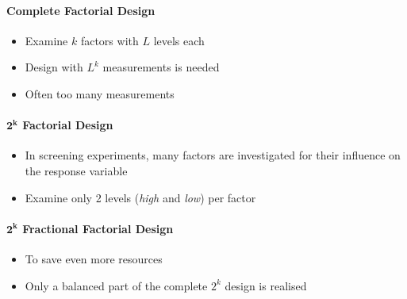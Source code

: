 \documentclass[11pt]{article}
\theoremstyle{definition}
\begin{document}
\paragraph{Complete Factorial Design}
\begin{itemize}[nosep]
	\item Examine $k$ factors with $L$ levels each
	\item Design with $L^k$ measurements is needed
	\item Often too many measurements
\end{itemize}

\paragraph{$\bm{2^k}$ Factorial Design}
\begin{itemize}[nosep]
	\item In screening experiments, many factors are investigated for their influence on the response variable
	\item Examine only 2 levels (\textit{high} and \textit{low}) per factor
\end{itemize}

\paragraph{$\bm{2^k}$ Fractional Factorial Design}
\begin{itemize}[nosep]
	\item To save even more resources
	\item Only a balanced part of the complete $2^k$ design is realised
\end{itemize}
\end{document}
